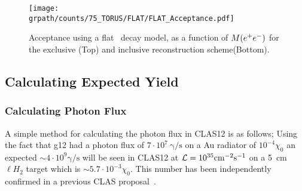  \begin{figure}[h!]\begin{center}
 		\texttt{[image: \\grpath/counts/75\_TORUS/FLAT/FLAT\_Acceptance.pdf]}
 		\caption[Acceptance, as a function of $M(\epem)$]{\label{fig:FLATaccepted}{Acceptance using a flat \epemT \ decay model, as a function of $M(\epem)$ for the exclusive (Top) and inclusive reconstruction scheme(Bottom).}}
 \end{center}\end{figure} 
\FloatBarrier
\subsection{Calculating Expected Yield}
\subsubsection{Calculating Photon Flux}\label{sec:calflux}
A simple method for calculating the photon flux in CLAS12 is as follows; Using the fact that g12 had a photon flux of $7\cdot 10^7 \ \mathrm{\gamma/s}$ on a Au radiator of $10^{-4} \chi_0$ an expected $\sim 4\cdot 10^9  \mathrm{\gamma/s}$ will be seen in CLAS12 at ${\cal L} = 10^{35}\mathrm{cm^{-2}s^{-1}}$ on a 5~cm $\ell H_2$ target which is $\sim 5.7\cdot 10^{-3} \chi_0$. This number has been independently confirmed in a previous CLAS proposal~\cite{clas.proposal.meson}.
